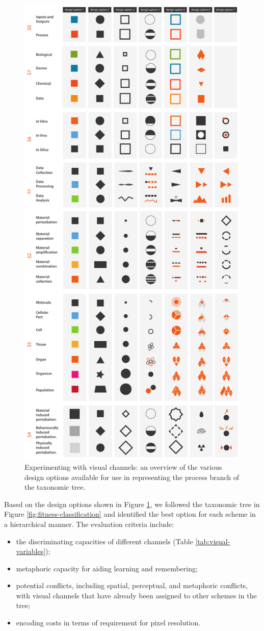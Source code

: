 \begin{figure}[t!]
\centering
\includegraphics[width=.65\textwidth]{images/glyph-taxonomy/design-options.pdf}
\caption{Experimenting with visual channels: an overview of the various design options available for use in representing the process branch of the taxonomic tree.}
\label{fig:glyph-design-options}
\vspace{-10pt}
\end{figure}

Based on the design options shown in Figure \ref{fig:glyph-design-options}, we followed the taxonomic tree in Figure \ref{fig:fitness-classification} and identified the best option for each scheme in a hierarchical manner.
The evaluation criteria include:
%
\begin{itemize}
\item
the discriminating capacities of different channels (Table \ref{tab:visual-variables});
\item
metaphoric capacity for aiding learning and remembering;
\item
potential conflicts, including spatial, perceptual, and metaphoric conflicts, with visual channels that have already been assigned to other schemes in the tree;
\item
encoding costs in terms of requirement for pixel resolution.
\end{itemize}

